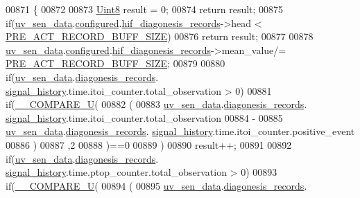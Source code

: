 \begin{DoxyCode}
00871                             \{
00872 
00873     \hyperlink{a00072_af84840501dec18061d18a68c162a8fa2}{Uint8} result = 0;
00874 \textcolor{keywordflow}{return} result;
00875     \textcolor{keywordflow}{if}(\hyperlink{a00073_adb4cffe9b88704fe686a94fe9996fa52}{uv\_sen\_data}.\hyperlink{a00035_a94b2d1f6ea4ab334c74d24984dd27843}{configured}.\hyperlink{a00021_ae18294f7499d9fcb5ec796a1816b8cd8}{hif\_diagonesis\_records}->head < 
      \hyperlink{a00022_a18dcecc16ded13fa622e0913e73442e6}{PRE\_ACT\_RECORD\_BUFF\_SIZE})
00876         \textcolor{keywordflow}{return} result;
00877 
00878     \hyperlink{a00073_adb4cffe9b88704fe686a94fe9996fa52}{uv\_sen\_data}.\hyperlink{a00035_a94b2d1f6ea4ab334c74d24984dd27843}{configured}.\hyperlink{a00021_ae18294f7499d9fcb5ec796a1816b8cd8}{hif\_diagonesis\_records}->mean\_value/=
      \hyperlink{a00022_a18dcecc16ded13fa622e0913e73442e6}{PRE\_ACT\_RECORD\_BUFF\_SIZE};
00879 
00880     \textcolor{keywordflow}{if}(\hyperlink{a00073_adb4cffe9b88704fe686a94fe9996fa52}{uv\_sen\_data}.\hyperlink{a00035_a7ae905b560513ad201e58c2f63375030}{diagonesis\_records}.
      \hyperlink{a00017_affb63906d23cb1cb7787d61eaaedfb60}{signal\_history}.time.itoi\_counter.total\_observation > 0)
00881     \textcolor{keywordflow}{if}(\hyperlink{a00021_a2ec57e7d50ba444ecb9e5c8b717d832d}{\_\_COMPARE\_U}(
00882             (
00883             \hyperlink{a00073_adb4cffe9b88704fe686a94fe9996fa52}{uv\_sen\_data}.\hyperlink{a00035_a7ae905b560513ad201e58c2f63375030}{diagonesis\_records}.
      \hyperlink{a00017_affb63906d23cb1cb7787d61eaaedfb60}{signal\_history}.time.itoi\_counter.total\_observation
00884             -
00885             \hyperlink{a00073_adb4cffe9b88704fe686a94fe9996fa52}{uv\_sen\_data}.\hyperlink{a00035_a7ae905b560513ad201e58c2f63375030}{diagonesis\_records}.
      \hyperlink{a00017_affb63906d23cb1cb7787d61eaaedfb60}{signal\_history}.time.itoi\_counter.positive\_event
00886             )
00887             ,2
00888             )==0
00889            )
00890         result++;
00891 
00892     \textcolor{keywordflow}{if}(\hyperlink{a00073_adb4cffe9b88704fe686a94fe9996fa52}{uv\_sen\_data}.\hyperlink{a00035_a7ae905b560513ad201e58c2f63375030}{diagonesis\_records}.
      \hyperlink{a00017_affb63906d23cb1cb7787d61eaaedfb60}{signal\_history}.time.ptop\_counter.total\_observation > 0)
00893     \textcolor{keywordflow}{if}(\hyperlink{a00021_a2ec57e7d50ba444ecb9e5c8b717d832d}{\_\_COMPARE\_U}(
00894           (
00895            \hyperlink{a00073_adb4cffe9b88704fe686a94fe9996fa52}{uv\_sen\_data}.\hyperlink{a00035_a7ae905b560513ad201e58c2f63375030}{diagonesis\_records}.

\end{DoxyCode}
